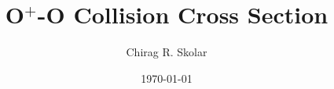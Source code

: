 \documentclass{report}
\title{O$^+$-O Collision Cross Section}
\author{Chirag R. Skolar}
\date{\today}
\begin{document}
	\maketitle
	
	\tableofcontents
	
	
	
	
	
	
		
	
		
	
	
	
	
	
	\begin{appendices}
		
		
	\end{appendices}
	
\end{document}
